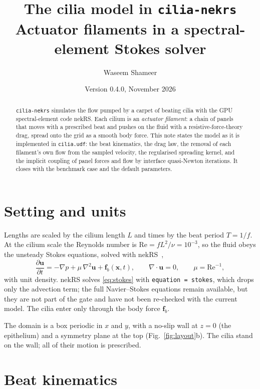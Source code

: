 \documentclass[10pt,a4paper]{article}
\title{\textbf{The cilia model in \texttt{cilia-nekrs}}\\[2pt]
\large Actuator filaments in a spectral-element Stokes solver}
\author{Waseem Shameer}
\date{Version 0.4.0, November 2026}
\newcommand{\vect}[1]{\bm{#1}}
\newcommand{\code}[1]{\texttt{#1}}
\begin{document}
\maketitle

\begin{abstract}
\noindent
\texttt{cilia-nekrs} simulates the flow pumped by a carpet of beating cilia with the GPU spectral-element code nekRS.
Each cilium is an \emph{actuator filament}: a chain of panels that moves with a prescribed beat and pushes on the fluid with a resistive-force-theory drag, spread onto the grid as a smooth body force.
This note states the model as it is implemented in \code{cilia.udf}: the beat kinematics, the drag law, the removal of each filament's own flow from the sampled velocity, the regularised spreading kernel, and the implicit coupling of panel forces and flow by interface quasi-Newton iterations.
It closes with the benchmark case and the default parameters.
\end{abstract}

\section{Setting and units}

Lengths are scaled by the cilium length $L$ and times by the beat period $T = 1/f$.
At the cilium scale the Reynolds number is $\mathrm{Re} = fL^2/\nu = 10^{-3}$, so the fluid obeys the unsteady Stokes equations, solved with nekRS~\cite{nekRS},
\begin{equation}
  \frac{\partial \vect u}{\partial t} = -\nabla p + \mu\,\nabla^2 \vect u + \vect f_b(\vect x,t),
  \qquad \nabla\cdot\vect u = 0,
  \qquad \mu = \mathrm{Re}^{-1},
  \label{eq:stokes}
\end{equation}
with unit density.
nekRS solves \eqref{eq:stokes} with \code{equation = stokes}, which drops only the advection term; the full Navier--Stokes equations remain available, but they are not part of the gate and have not been re-checked with the current model.
The cilia enter only through the body force $\vect f_b$.

The domain is a box periodic in $x$ and $y$, with a no-slip wall at $z = 0$ (the epithelium) and a symmetry plane at the top (Fig.~\ref{fig:layout}b).
The cilia stand on the wall; all of their motion is prescribed.

\section{Beat kinematics}
\end{document}
